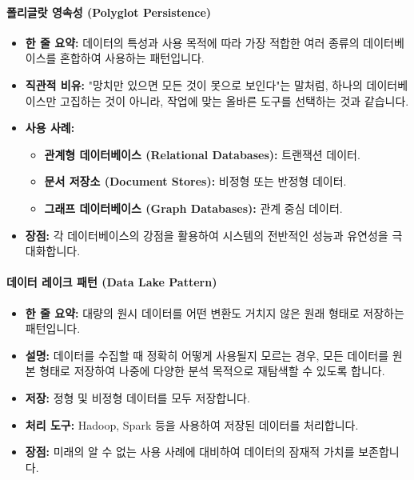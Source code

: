 \documentclass[11pt,a4paper]{article}
\begin{document}
\paragraph{폴리글랏 영속성 (Polyglot Persistence)}
\begin{itemize}
    \item \textbf{한 줄 요약:} 데이터의 특성과 사용 목적에 따라 가장 적합한 여러 종류의 데이터베이스를 혼합하여 사용하는 패턴입니다.
    \item \textbf{직관적 비유:} "망치만 있으면 모든 것이 못으로 보인다"는 말처럼, 하나의 데이터베이스만 고집하는 것이 아니라, 작업에 맞는 올바른 도구를 선택하는 것과 같습니다.
    \item \textbf{사용 사례:}
    \begin{itemize}
        \item \textbf{관계형 데이터베이스 (Relational Databases):} 트랜잭션 데이터.
        \item \textbf{문서 저장소 (Document Stores):} 비정형 또는 반정형 데이터.
        \item \textbf{그래프 데이터베이스 (Graph Databases):} 관계 중심 데이터.
    \end{itemize}
    \item \textbf{장점:} 각 데이터베이스의 강점을 활용하여 시스템의 전반적인 성능과 유연성을 극대화합니다.
\end{itemize}

\paragraph{데이터 레이크 패턴 (Data Lake Pattern)}
\begin{itemize}
    \item \textbf{한 줄 요약:} 대량의 원시 데이터를 어떤 변환도 거치지 않은 원래 형태로 저장하는 패턴입니다.
    \item \textbf{설명:} 데이터를 수집할 때 정확히 어떻게 사용될지 모르는 경우, 모든 데이터를 원본 형태로 저장하여 나중에 다양한 분석 목적으로 재탐색할 수 있도록 합니다.
    \item \textbf{저장:} 정형 및 비정형 데이터를 모두 저장합니다.
    \item \textbf{처리 도구:} Hadoop, Spark 등을 사용하여 저장된 데이터를 처리합니다.
    \item \textbf{장점:} 미래의 알 수 없는 사용 사례에 대비하여 데이터의 잠재적 가치를 보존합니다.
\end{itemize}
\end{document}
